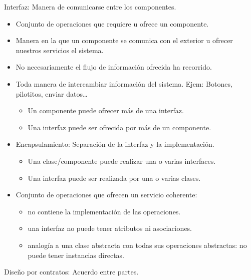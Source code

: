 \documentclass[12pt, twoside, openright]{report} %
\begin{document}
Interfaz: Manera de comunicarse entre los componentes.
\begin{itemize}
	\item Conjunto de operaciones que requiere u ofrece un componente.
	\item Manera en la que un componente se comunica con el exterior u
		ofrecer nuestros servicios el sistema.
	\item No necesariamente el flujo de información ofrecida ha recorrido.
	\pagebreak

	\item Toda manera de intercambiar información del sistema. Ejem:
		Botones, pilotitos, enviar datos\ldots{}
		\begin{itemize}
			\item Un componente puede ofrecer más de una interfaz.
			\item Una interfaz puede ser ofrecida por más de un componente.
		\end{itemize}
	\item Encapsulamiento: Separación de la interfaz y la implementación.
		\begin{itemize}
			\item Una clase/componente puede realizar una o varias interfaces.
			\item Una interfaz puede ser realizada por una o varias clases.
		\end{itemize}
	\item Conjunto de operaciones que ofrecen un servicio coherente:
		\begin{itemize}
			\item no contiene la implementación de las operaciones.
			\item una interfaz no puede tener atributos ni asociaciones.
			\item analogía a una clase abstracta con todas sus operaciones
			abstractas: no puede tener instancias directas.
		\end{itemize}
\end{itemize}

Diseño por contratos: Acuerdo entre partes.
\end{document}
